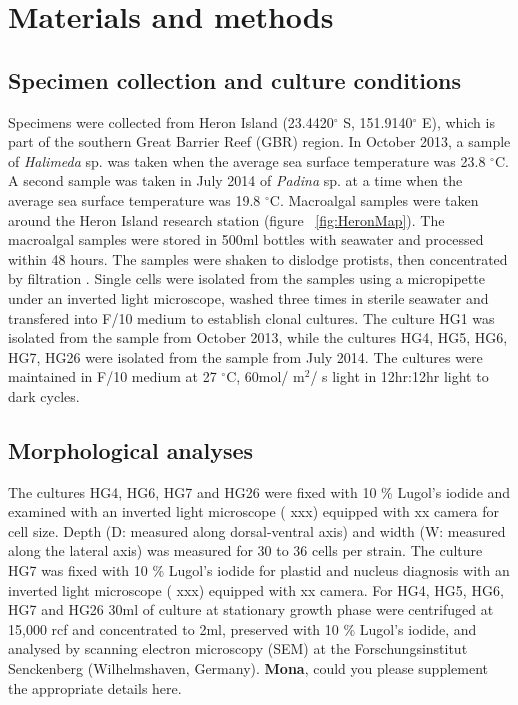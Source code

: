 \documentclass[12pt]{article}
\begin{document}
 \newpage
\section{Materials and methods}

\subsection{Specimen collection and culture conditions}
Specimens were collected from Heron Island (23.4420$^{\circ}$ S, 151.9140$^{\circ}$ E), which is part of the southern Great Barrier Reef (GBR) region. 
In October 2013, a sample of \emph{Halimeda} sp. was taken when the average sea surface temperature was 23.8 $^{\circ}$C. 
A second sample was taken in July 2014 of \emph{Padina} sp. at a time when the average sea surface temperature was 19.8 $^{\circ}$C.
Macroalgal samples were taken around the Heron Island research station (figure ~\ref{fig:HeronMap}). The macroalgal samples were stored in 500ml bottles with seawater and processed within 48 hours. The samples were shaken to dislodge protists, then concentrated by filtration \citep{litaker2010global}. Single cells were isolated from the samples using a micropipette under an inverted light microscope, washed three times in sterile seawater and transfered into F/10 medium \citep{holmes1991strain} to establish clonal cultures.
The culture HG1 was isolated from the sample from October 2013, while the cultures HG4, HG5, HG6, HG7, HG26 were isolated from the sample from July 2014.
The cultures were maintained in F/10 medium at 27 $^{\circ}$C, 60mol/ m$^{2}$/ s light in 12hr:12hr light to dark cycles.





\subsection{Morphological analyses}
The cultures HG4, HG6, HG7 and HG26 were fixed with 10 \% Lugol's iodide and examined with an inverted light microscope ( xxx) equipped with xx camera for cell size. Depth (D: measured along dorsal-ventral axis) and width (W: measured along the lateral axis) was measured for 30 to 36 cells per strain.
The culture HG7 was fixed with 10 \% Lugol's iodide for plastid and nucleus diagnosis with an inverted light microscope ( xxx) equipped with xx camera.
For HG4, HG5, HG6, HG7 and HG26 30ml of culture at stationary growth phase were centrifuged at 15,000 rcf and concentrated to 2ml, preserved with 10 \% Lugol's iodide, and analysed by scanning electron microscopy (SEM) at the Forschungsinstitut Senckenberg (Wilhelmshaven, Germany). 
\textbf{Mona}, could you please supplement the appropriate details here. 
\end{document}
